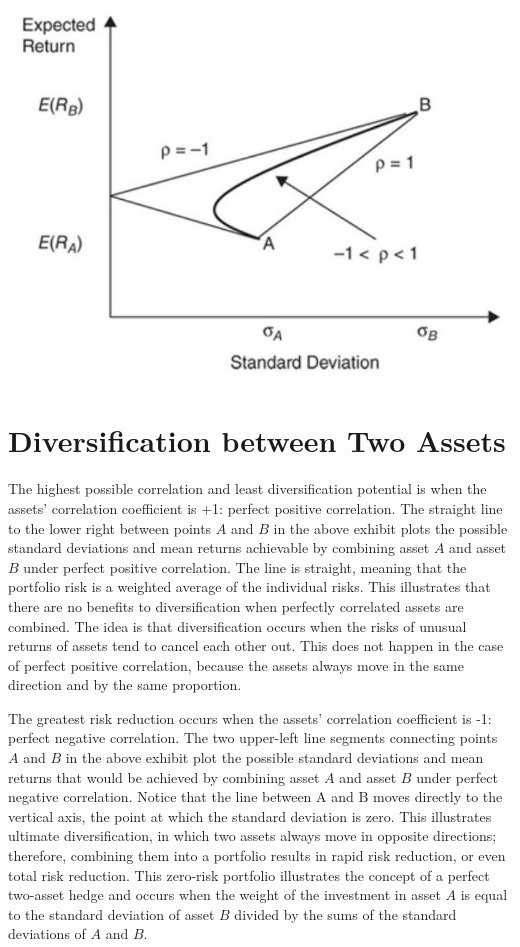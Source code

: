 \documentclass[11pt]{article}
\begin{document}
\begin{center}
\includegraphics[max width=\textwidth]{2024_04_10_e3fefff2393dcb37755bg-4}
\end{center}

\section*{Diversification between Two Assets}
The highest possible correlation and least diversification potential is when the assets' correlation coefficient is +1: perfect positive correlation. The straight line to the lower right between points $A$ and $B$ in the above exhibit plots the possible standard deviations and mean returns achievable by combining asset $A$ and asset $B$ under perfect positive correlation. The line is straight, meaning that the portfolio risk is a weighted average of the individual risks. This illustrates that there are no benefits to diversification when perfectly correlated assets are combined. The idea is that diversification occurs when the risks of unusual returns of assets tend to cancel each other out. This does not happen in the case of perfect positive correlation, because the assets always move in the same direction and by the same proportion.

The greatest risk reduction occurs when the assets' correlation coefficient is -1: perfect negative correlation. The two upper-left line segments connecting points $A$ and $B$ in the above exhibit plot the possible standard deviations and mean returns that would be achieved by combining asset $A$ and asset $B$ under perfect negative correlation. Notice that the line between $\mathrm{A}$ and $\mathrm{B}$ moves directly to the vertical axis, the point at which the standard deviation is zero. This illustrates ultimate diversification, in which two assets always move in opposite directions; therefore, combining them into a portfolio results in rapid risk reduction, or even total risk reduction. This zero-risk portfolio illustrates the concept of a perfect two-asset hedge and occurs when the weight of the investment in asset $A$ is equal to the standard deviation of asset $B$ divided by the sums of the standard deviations of $A$ and $B$.
\end{document}
